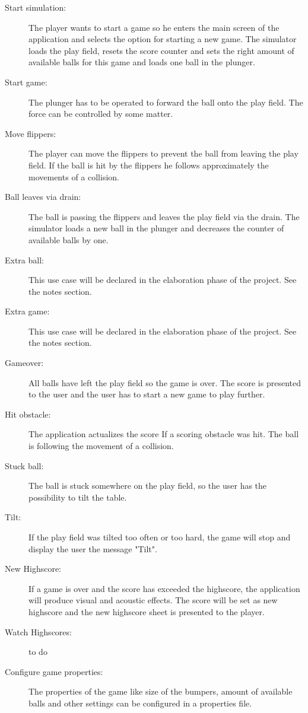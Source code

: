 \documentclass[fontsize=12pt,
               paper=a4,
               twoside=false,
               parskip=half,
               ]{scrartcl}
\begin{document}
\begin{description}

\item[Start simulation:]   The player wants to start a game so he enters the main screen of the application and selects the option for starting a new game. The simulator loads the play field, resets the score counter and sets the right amount of available balls for this game and loads one ball in the plunger.

\item[Start game:] The plunger has to be operated to forward the ball onto the play field.  The force can be controlled by some matter.

\item[Move flippers:] The player can move the flippers to prevent the ball from leaving the play field. If the ball is hit by the flippers he follows approximately the movements of a collision.

\item[Ball leaves via drain:] The ball is passing the flippers and leaves the play field via the drain. The simulator loads a new ball in the plunger and decreases the counter of available balls by one.

\item[Extra ball:] This use case will be declared in the elaboration phase of the project. See the notes section.

\item[Extra game:] This use case will be declared in the elaboration phase of the project. See the notes section.

\item[Gameover:] All balls have left the play field so the game is over. The score is presented to the user and the user has to start a new game to play further.

\item[Hit obstacle:] The application actualizes the score If a scoring obstacle  was hit. The ball is following the movement of a collision.

\item[Stuck ball:] The ball is stuck somewhere on the play field, so the user has the possibility to tilt the table.

\item[Tilt:] If the play field was tilted too often or too hard, the game will stop and display the user the message "Tilt".

\item[New Highscore:] If a game is over and the score has exceeded the highscore, the application will produce visual and acoustic effects. The score will be set as new highscore and the new highscore sheet is presented to the player.

\item[Watch Highscores:] 
to do

\item[Configure game properties:] The properties of the game like size of the bumpers, amount of available balls and other settings can be configured in a properties file.

\end{description}
\end{document}
